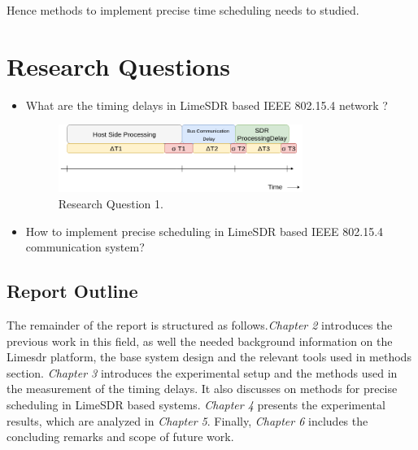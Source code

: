 Hence methods to implement precise time scheduling needs to studied.

\section{Research Questions}
\begin{itemize}
\item{ What are the timing delays in  LimeSDR based IEEE 802.15.4 network ?}
\begin{figure}[!h]
\centering
\includegraphics[width=0.75\textwidth]{Figure/RQ1.png}
\caption{Research Question 1.}
\label{rq1}
\end{figure}
\item{ How to implement precise scheduling in LimeSDR based IEEE 802.15.4 communication system? }
\end{itemize}

\subsection{Report Outline}
The remainder of the report is structured as follows.\textit{Chapter 2} introduces the previous work in this field, as well the needed background information on the Lime\ac{sdr} platform, the base system design and the relevant tools used in methods section. \textit{Chapter 3} introduces the experimental setup and the methods used in the measurement of the timing delays. It also discusses on methods for precise scheduling in LimeSDR based systems. \textit{Chapter 4} presents the experimental results, which are analyzed in \textit{Chapter 5}. Finally, \textit{Chapter 6} includes the concluding remarks and scope of future work.
